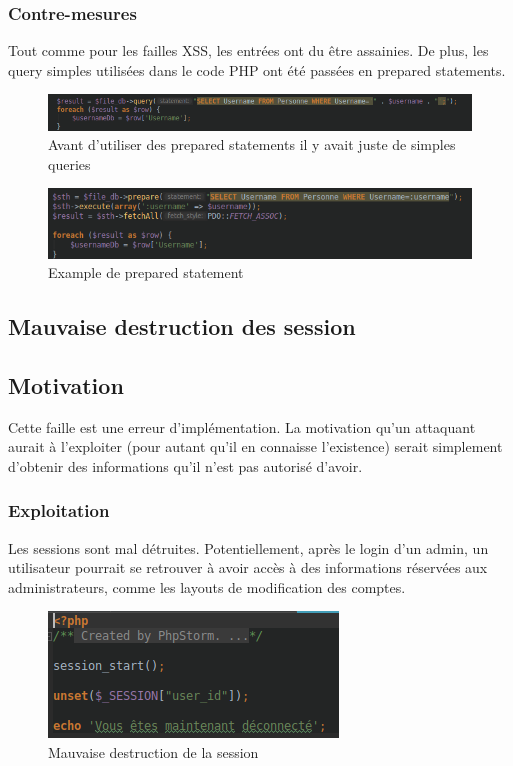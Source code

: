 \documentclass[12pt]{article}
\begin{document}
\subsubsection{Contre-mesures}
Tout comme pour les failles XSS, les entrées ont du être assainies. De plus, les query simples utilisées dans le code PHP ont été passées en prepared statements.

\begin{figure}[H]
\centering
\includegraphics[width=\linewidth]{images/simpleQuery.png}
\caption{Avant d'utiliser des prepared statements il y avait juste de simples queries}
\end{figure}

\begin{figure}[H]
\centering
\includegraphics[width=\linewidth]{images/preparedStatement.png}
\caption{Example de prepared statement}
\end{figure}

\subsection{Mauvaise destruction des session}
\subsection{Motivation}
Cette faille est une erreur d'implémentation. La motivation qu'un attaquant aurait à l'exploiter (pour autant qu'il en connaisse l'existence) serait simplement d'obtenir des informations qu'il n'est pas autorisé d'avoir.
\subsubsection{Exploitation}
Les sessions sont mal détruites. Potentiellement, après le login d'un admin, un utilisateur pourrait se retrouver à avoir accès à des informations réservées aux administrateurs, comme les layouts de modification des comptes. 
\begin{figure}[H]
\centering
\includegraphics[width=\linewidth]{images/unset.png}
\caption{Mauvaise destruction de la session}
\end{figure}
\end{document}

